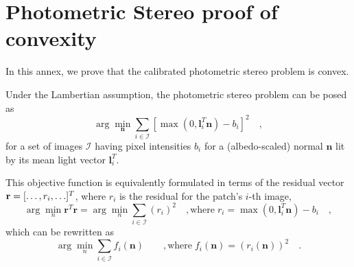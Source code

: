 \chapter{Photometric Stereo proof of convexity}     %
\label{annex2}

In this annex, we prove that the calibrated photometric stereo problem is convex.

Under the Lambertian assumption, the photometric stereo problem can be posed as
\begin{equation}
\arg\min_\mathbf{n} \sum_{i \in \mathcal{I}} \left[ \max\left(0, \mathbf{l}_{i}^T \mathbf{n} \right) - b_i \right]^2 \quad ,
\label{eq:init} 
\end{equation}
for a set of images $\mathcal{I}$ having pixel intensities $b_{i}$ for a (albedo-scaled) normal $\mathbf{n}$ lit by its mean light vector $\mathbf{l}_{i}^T$.

This objective function is equivalently formulated in terms of the residual vector \mbox{${\bf r} = [\ldots ,  {r_i} , \ldots]^T$}, where $r_i$ is the residual for the patch's $i$-th image,
\begin{equation}
\arg\min_n  \mathbf{r}^T\mathbf{r} = \arg\min_n \sum_{i \in \mathcal{I}} (r_i)^2 \quad , \mathrm{where} \; r_i = \max( 0, \mathbf{l}_i^T \mathbf{n} ) - b_i \quad,
\label{eq:defresidual}
\end{equation}
%
which can be rewritten as
%
\begin{equation}
\arg\min_n \sum_{i \in \mathcal{I}} f_i(\mathbf{n})
\qquad, \mathrm{where} \; f_i(\mathbf{n}) = \left( r_i(\mathbf{n}) \right)^2 \quad.
\end{equation}
%

